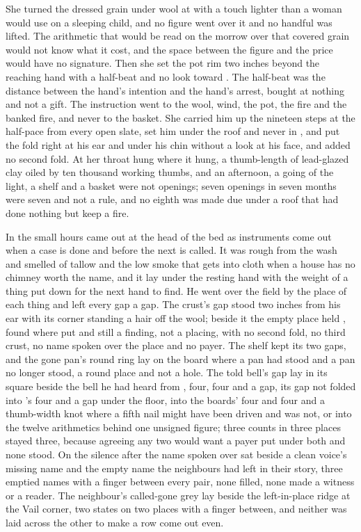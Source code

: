She turned the dressed grain under wool at  with a touch lighter than a woman would use on a sleeping child, and no figure went over it and no handful was lifted. The arithmetic that would be read on the morrow over that covered grain would not know what it cost, and the space between the figure and the price would have no signature. Then she set the pot rim two inches beyond the reaching hand with a half-beat and no look toward . The half-beat was the distance between the hand's intention and the hand's arrest, bought at nothing and not a gift. The instruction went to the wool,  wind, the pot, the fire and the banked fire, and never to the basket. She carried him up the nineteen steps at the half-pace from every open slate, set him under the roof and never in , and put the fold right at his ear and under his chin without a look at his face, and added no second fold. At her throat  hung where it hung, a thumb-length of lead-glazed clay oiled by ten thousand working thumbs, and an afternoon, a going of the light, a shelf and a basket were not openings; seven openings in seven months were seven and not a rule, and no eighth was made due under a roof that had done nothing but keep a fire.

\scenebreak

In the small hours  came out at the head of the bed as instruments come out when a case is done and before the next is called. It was rough from the wash and smelled of tallow and the low smoke that gets into cloth when a house has no chimney worth the name, and it lay under the resting hand with the weight of a thing put down for the next hand to find. He went over the field by the place of each thing and left every gap a gap. The crust's gap stood two inches from his ear with its corner standing a hair off the wool; beside it the empty place held , found where put and still a finding, not a placing, with no second fold, no third crust, no name spoken over the place and no payer. The shelf kept its two gaps, and the gone pan's round ring lay on the board where a pan had stood and a pan no longer stood, a round place and not a hole. The told bell's gap lay in its square beside the bell he had heard from , four, four and a gap, its gap not folded into 's four and a gap under the floor, into the boards' four and four and a thumb-width knot where a fifth nail might have been driven and was not, or into the twelve arithmetics behind one unsigned figure; three counts in three places stayed three, because agreeing any two would want a payer put under both and none stood. On  the silence after the name spoken over  sat beside a clean voice's missing name and the empty name the neighbours had left in their story, three emptied names with a finger between every pair, none filled, none made a witness or a reader. The neighbour's called-gone grey lay beside the left-in-place ridge at the Vail corner, two states on two places with a finger between, and neither was laid across the other to make a row come out even.

